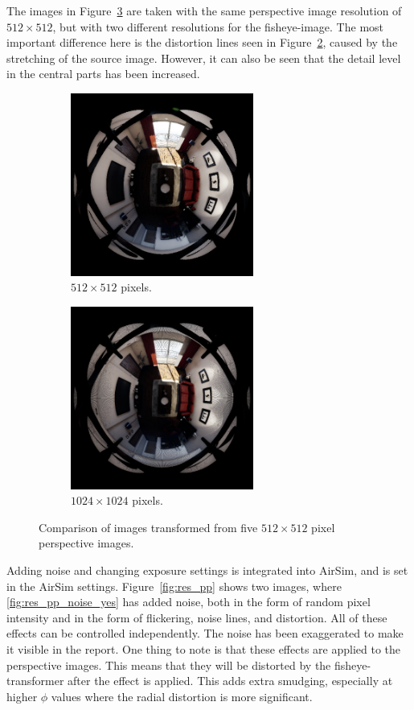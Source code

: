 The images in Figure~\ref{fig:res_comp_equal} are taken with the same perspective image resolution of $512 \times 512$, but with two different resolutions for the fisheye-image. The most important difference here is the distortion lines seen in Figure~\ref{fig:res_comp_equal_512_1024}, caused by the stretching of the source image. However, it can also be seen that the detail level in the central parts has been increased.

\begin{figure}[!htb]
    \centering
    \begin{subfigure}{0.45\textwidth}
        \centering
        \includegraphics[height=6cm]{rapport/fig/Results/512to512.jpeg}
        \caption{$512 \times 512$ pixels.}
        \label{fig:res_comp_equal_512_512}
    \end{subfigure}
    \begin{subfigure}{0.45\textwidth}
        \centering
        \includegraphics[height=6cm]{rapport/fig/Results/512to1024.jpeg}
        \caption{$1024 \times 1024$ pixels.}
        \label{fig:res_comp_equal_512_1024}
    \end{subfigure}
    \caption{Comparison of images transformed from five $512 \times 512$ pixel perspective images.}
    \label{fig:res_comp_equal}
\end{figure}

Adding noise and changing exposure settings is integrated into AirSim, and is set in the AirSim settings. Figure~\ref{fig:res_pp} shows two images, where \ref{fig:res_pp_noise_yes} has added noise, both in the form of random pixel intensity and in the form of flickering, noise lines, and distortion. All of these effects can be controlled independently. The noise has been exaggerated to make it visible in the report. One thing to note is that these effects are applied to the perspective images. This means that they will be distorted by the fisheye-transformer after the effect is applied. This adds extra smudging, especially at higher $\phi$ values where the radial distortion is more significant. 

